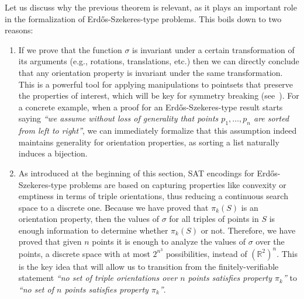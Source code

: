 Let us discuss why the previous theorem is relevant, as it plays an important role in the formalization of Erd\H{o}s-Szekeres-type problems. This boils down to two reasons:
\begin{enumerate}
  \item If we prove that the function $\sigma$ is invariant under a certain transformation of its arguments (e.g., rotations, translations, etc.) then we can directly conclude that any orientation property is invariant under the same transformation. This is a powerful tool for applying manipulations to pointsets that preserve the properties of interest, which will be key for symmetry breaking (see~). For a concrete example, when a proof for an Erd\H{o}s-Szekeres-type result starts saying \emph{``we assume without loss of generality that points $p_1, \ldots, p_n$ are sorted from left to right''}, we can immediately formalize that this assumption indeed maintains generality for orientation properties, as sorting a list naturally induces a bijection.
  \item As introduced at the beginning of this section, SAT encodings for Erd\H{o}s-Szekeres-type problems are based on capturing properties like convexity or emptiness in terms of triple orientations, thus reducing a continuous search space to a discrete one. Because we have proved that $\pi_k(S)$ is an orientation property, then the values of $\sigma$ for all triples of points in $S$ is enough information to determine whether $\pi_k(S)$ or not.  Therefore, we have proved that given $n$ points it is enough to analyze the values of $\sigma$ over the points, a discrete space with at most $2^{n^3}$ possibilities, instead of $\left(\mathbb{R}^2\right)^n$. This is the key idea that will allow us to transition from the finitely-verifiable statement \emph{``no set of triple orientations over $n$ points satisfies property $\pi_k$''} to \emph{``no set of $n$ points satisfies property $\pi_k$''}.
\end{enumerate}


